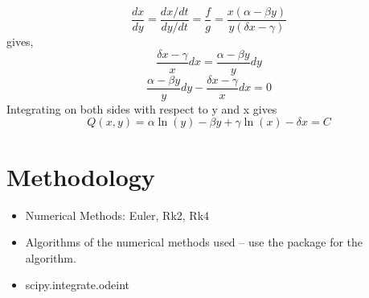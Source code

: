 \documentclass[12pt]{article}
\begin{document}
\begin{equation*}
    \frac { d x } { d y } = \frac { d x / d t } { d y / d t } = \frac { f } { g } = \frac  { x(\alpha  - \beta  y)} { y(\delta x  - \gamma )}
\end{equation*}
gives,
\begin{equation*}
    \frac { \delta x - \gamma}{x}  d x = \frac  {\alpha - \beta y }{ y } d y
\end{equation*}
\begin{equation*}
     \frac  {\alpha - \beta y }{ y } d y - \frac { \delta x - \gamma}{x}  d x = 0
\end{equation*}
Integrating on both sides with respect to y and x gives
\begin{equation*}
      Q(x,y) = \alpha \ln ( y ) - \beta y + \gamma \ln ( x ) - \delta x   = C
\end{equation*}

\section{Methodology}
\label{sec:method}
\begin{itemize}
    \item Numerical Methods: Euler, Rk2, Rk4 
    \item Algorithms of the numerical methods used -- use the package for the algorithm.
    \item scipy.integrate.odeint \cite{noauthor_scipyintegrateodeint_nodate}
\end{itemize}


\end{document}
